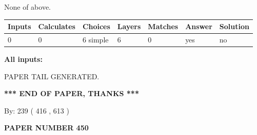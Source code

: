 \documentclass{ctexart}
\begin{document}
 
 None of above.
 
 
\noindent{}
 
 
   
   
   
   
\noindent\begin{tabular}{|l|l|l|l|l|l|l|}
 \hline
Inputs & Calculates & Choices & Layers & Matches & Answer & Solution \\ \hline
 0  & 
 0  & 
 6
  simple  
  & 
 6  & 
 0  & 
  yes & 
  no 
  \\ \hline
 \end{tabular}
   
   
   
   
\noindent{}
   
   
   
   
\noindent\vspace{0.1in}\hspace{-0.08in} {\textbf{\Large{All inputs: }}}
   
   
   
   
   
   
 \vspace{0.2in}
 
   
   
\vspace{2.0in} PAPER TAIL GENERATED.
   
   
   
   
\vspace{1.0in} 
{\textbf{\large{ *** END OF PAPER, THANKS *** }}} 
   
   
\hspace{1.0in} By: 
 239 ( 416 ,  613 )
   
   
   
   
\newpage 
\setcounter{page}{ 
   450001 } 
   
   
   
   
 {\textbf{ \Large{ PAPER NUMBER  450  }}}
   
   
\vspace{0.2in}
   
   
   
   
   
   
   
\end{document}
